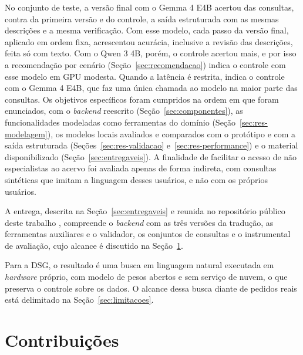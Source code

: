 No conjunto de teste, a versão final com o Gemma 4 E4B acertou  das consultas, contra  da primeira versão e  do controle, a saída estruturada com as mesmas descrições e a mesma verificação. Com esse modelo, cada passo da versão final, aplicado em ordem fixa, acrescentou acurácia, inclusive a revisão das descrições, feita só com texto. Com o Qwen 3 4B, porém, o controle acertou mais, e por isso a recomendação por cenário (Seção~\ref{sec:recomendacao}) indica o controle com esse modelo em GPU modesta. Quando a latência é restrita, indica o controle com o Gemma 4 E4B, que faz uma única chamada ao modelo na maior parte das consultas. Os objetivos específicos foram cumpridos na ordem em que foram enunciados, com o \textit{backend} reescrito (Seção~\ref{sec:componentes}), as funcionalidades modeladas como ferramentas do domínio (Seção~\ref{sec:res-modelagem}), os modelos locais avaliados e comparados com o protótipo e com a saída estruturada (Seções~\ref{sec:res-validacao} e~\ref{sec:res-performance}) e o material disponibilizado (Seção~\ref{sec:entregaveis}). A finalidade de facilitar o acesso de não especialistas ao acervo foi avaliada apenas de forma indireta, com consultas sintéticas que imitam a linguagem desses usuários, e não com os próprios usuários.

A entrega, descrita na Seção~\ref{sec:entregaveis} e reunida no repositório público deste trabalho \cite{correa2026pfcbusca}, compreende o \textit{backend} com as três versões da tradução, as ferramentas auxiliares e o validador, os conjuntos de consultas e o instrumental de avaliação, cujo alcance é discutido na Seção~\ref{sec:contribuicoes}.

Para a DSG, o resultado é uma busca em linguagem natural executada em \textit{hardware} próprio, com modelo de pesos abertos e sem serviço de nuvem, o que preserva o controle sobre os dados. O alcance dessa busca diante de pedidos reais está delimitado na Seção~\ref{sec:limitacoes}.

\section{Contribuições}
\label{sec:contribuicoes}


